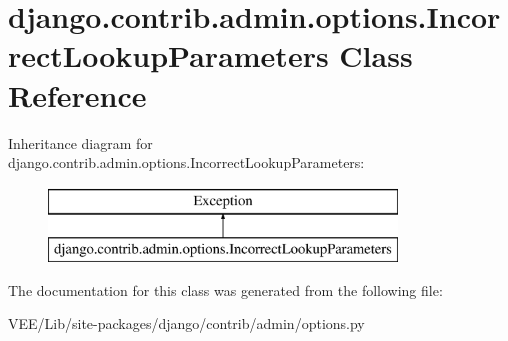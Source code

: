 \hypertarget{classdjango_1_1contrib_1_1admin_1_1options_1_1_incorrect_lookup_parameters}{}\section{django.\+contrib.\+admin.\+options.\+Incorrect\+Lookup\+Parameters Class Reference}
\label{classdjango_1_1contrib_1_1admin_1_1options_1_1_incorrect_lookup_parameters}
Inheritance diagram for django.\+contrib.\+admin.\+options.\+Incorrect\+Lookup\+Parameters\+:\begin{figure}[H]
\begin{center}
\leavevmode
\includegraphics[height=2.000000cm]{classdjango_1_1contrib_1_1admin_1_1options_1_1_incorrect_lookup_parameters}
\end{center}
\end{figure}


The documentation for this class was generated from the following file\+:\begin{DoxyCompactItemize}
\item 
V\+E\+E/\+Lib/site-\/packages/django/contrib/admin/options.\+py\end{DoxyCompactItemize}
